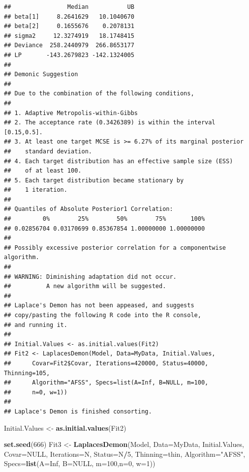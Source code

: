 \documentclass[
]{book}
\newenvironment{Shaded}{\begin{snugshade}}{\end{snugshade}}
\newcommand{\DataTypeTok}[1]{\textcolor[rgb]{0.13,0.29,0.53}{#1}}
\newcommand{\DecValTok}[1]{\textcolor[rgb]{0.00,0.00,0.81}{#1}}
\newcommand{\KeywordTok}[1]{\textcolor[rgb]{0.13,0.29,0.53}{\textbf{#1}}}
\newcommand{\NormalTok}[1]{#1}
\newcommand{\OperatorTok}[1]{\textcolor[rgb]{0.81,0.36,0.00}{\textbf{#1}}}
\newcommand{\OtherTok}[1]{\textcolor[rgb]{0.56,0.35,0.01}{#1}}
\newcommand{\StringTok}[1]{\textcolor[rgb]{0.31,0.60,0.02}{#1}}
\begin{document}
\begin{verbatim}
##                Median           UB
## beta[1]     8.2641629   10.1040670
## beta[2]     0.1655676    0.2078131
## sigma2     12.3274919   18.1748415
## Deviance  258.2440979  266.8653177
## LP       -143.2679823 -142.1324005
## 
## Demonic Suggestion
## 
## Due to the combination of the following conditions,
## 
## 1. Adaptive Metropolis-within-Gibbs
## 2. The acceptance rate (0.3426389) is within the interval [0.15,0.5].
## 3. At least one target MCSE is >= 6.27% of its marginal posterior
##    standard deviation.
## 4. Each target distribution has an effective sample size (ESS)
##    of at least 100.
## 5. Each target distribution became stationary by
##    1 iteration.
## 
## Quantiles of Absolute Posterior1 Correlation:
##         0%        25%        50%        75%       100% 
## 0.02856704 0.03170699 0.85367854 1.00000000 1.00000000 
## 
## Possibly excessive posterior correlation for a componentwise algorithm.
## 
## WARNING: Diminishing adaptation did not occur.
##          A new algorithm will be suggested.
## 
## Laplace's Demon has not been appeased, and suggests
## copy/pasting the following R code into the R console,
## and running it.
## 
## Initial.Values <- as.initial.values(Fit2)
## Fit2 <- LaplacesDemon(Model, Data=MyData, Initial.Values,
##      Covar=Fit2$Covar, Iterations=420000, Status=40000, Thinning=105,
##      Algorithm="AFSS", Specs=list(A=Inf, B=NULL, m=100,
##      n=0, w=1))
## 
## Laplace's Demon is finished consorting.
\end{verbatim}

\begin{Shaded}
\begin{Highlighting}[]
\NormalTok{Initial.Values <-}\StringTok{ }\KeywordTok{as.initial.values}\NormalTok{(Fit2)}

\KeywordTok{set.seed}\NormalTok{(}\DecValTok{666}\NormalTok{)}
\NormalTok{Fit3 <-}\StringTok{ }\KeywordTok{LaplacesDemon}\NormalTok{(Model, }\DataTypeTok{Data=}\NormalTok{MyData, Initial.Values,}
     \DataTypeTok{Covar=}\OtherTok{NULL}\NormalTok{, }\DataTypeTok{Iterations=}\NormalTok{N, }\DataTypeTok{Status=}\NormalTok{N}\OperatorTok{/}\DecValTok{5}\NormalTok{, }\DataTypeTok{Thinning=}\NormalTok{thin,}
     \DataTypeTok{Algorithm=}\StringTok{"AFSS"}\NormalTok{, }\DataTypeTok{Specs=}\KeywordTok{list}\NormalTok{(}\DataTypeTok{A=}\OtherTok{Inf}\NormalTok{, }\DataTypeTok{B=}\OtherTok{NULL}\NormalTok{, }\DataTypeTok{m=}\DecValTok{100}\NormalTok{,}\DataTypeTok{n=}\DecValTok{0}\NormalTok{, }\DataTypeTok{w=}\DecValTok{1}\NormalTok{))}
\end{Highlighting}
\end{Shaded}
\end{document}
